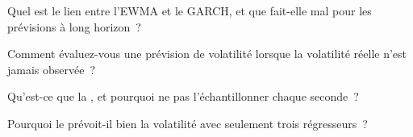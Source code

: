 \begin{interviewq}\label{iq:qm:volatility-models:3}
Quel est le lien entre l'EWMA et le GARCH, et que fait-elle mal pour les prévisions à long horizon~?
\end{interviewq}

\begin{interviewq}\label{iq:qm:volatility-models:4}
Comment évaluez-vous une prévision de volatilité lorsque la volatilité réelle n'est jamais observée~?
\end{interviewq}

\begin{interviewq}\label{iq:qm:volatility-models:5}
Qu'est-ce que la , et pourquoi ne pas l'échantillonner chaque seconde~?
\end{interviewq}

\begin{interviewq}\label{iq:qm:volatility-models:6}
Pourquoi le  prévoit-il bien la volatilité avec seulement trois régresseurs~?
\end{interviewq}
